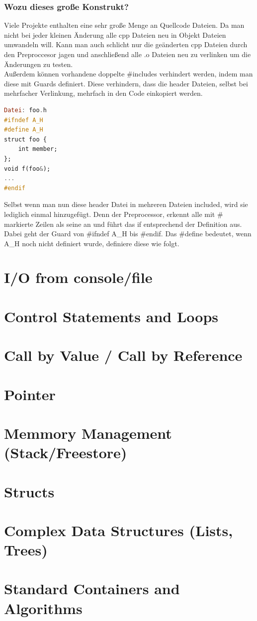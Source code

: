 \subsubsection{Wozu dieses große Konstrukt?}
Viele Projekte enthalten eine sehr große Menge an Quellcode Dateien. Da man nicht bei jeder kleinen Änderung alle cpp Dateien neu in Objekt Dateien umwandeln will. Kann man auch schlicht nur die geänderten cpp Dateien durch den Preproccesor jagen und anschließend alle .o Dateien neu zu verlinken um die Änderungen zu testen. \\
Außerdem können vorhandene doppelte \#includes verhindert werden, indem man diese mit Guards definiert. Diese verhindern, dass die header Dateien, selbst bei mehrfacher Verlinkung, mehrfach in den Code einkopiert werden.
\begin{lstlisting}[language=Haskell]  
Datei: foo.h
#ifndef A_H
#define A_H
struct foo {
	int member;
};
void f(foo&);
...
#endif
\end{lstlisting}
Selbst wenn man nun diese header Datei in mehreren Dateien included, wird sie lediglich einmal hinzugefügt. Denn der Preprocessor, erkennt alle mit \# markierte Zeilen als seine an und führt das if entsprechend der Definition aus. Dabei geht der Guard von \#ifndef A\_H bis \#endif. Das \#define bedeutet, wenn A\_H noch nicht definiert wurde, definiere diese wie folgt. 
\section{I/O from console/file}	
\section{Control Statements and Loops}
\section{Call by Value / Call by Reference}
\section{Pointer}
\section{Memmory Management (Stack/Freestore)}
\section{Structs}
\section{Complex Data Structures (Lists, Trees)}
\section{Standard Containers and Algorithms}	

